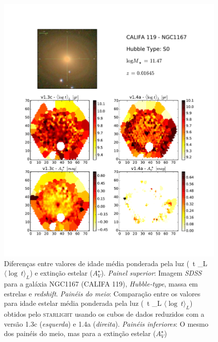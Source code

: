 \documentclass[a4paper,12pt]{article}
\newcommand{\meanL}[1]{\relax\ifmmode \langle #1 \rangle_L \else $\langle #1 \rangle_L$\xspace \fi}
\def\starlight{\textsc{starlight}\xspace}      %
\def\SDSS{\textit{SDSS}\xspace}           %
\begin{document}
\begin{figure}
	\begin{center}
    \includegraphics[height=1.\textwidth]{figuras/K0119-compv13v14-atflux_av.pdf}
    \caption[]{Diferenças entre valores de idade média ponderada pela luz (\meanL{\log\ t}) e extinção estelar ($A_V^\star$). {\em Painel superior}:
    Imagem \SDSS para a galáxia NGC1167 (CALIFA 119), {\em Hubble-type}, massa em estrelas e {\em redshift}. {\em Painéis do meio}: Comparação
    entre os valores para idade estelar média ponderada pela luz (\meanL{\log\ t}) obtidos pelo \starlight usando os cubos de dados reduzidos com a
    versão 1.3c ({\em esquerda}) e 1.4a ({\em direita}). {\em Painéis inferiores}: O mesmo dos painéis do meio, mas para a extinção estelar
    ($A_V^\star$)}
    \label{fig:K0119v13v14}
    \end{center}
\end{figure}
\end{document}
